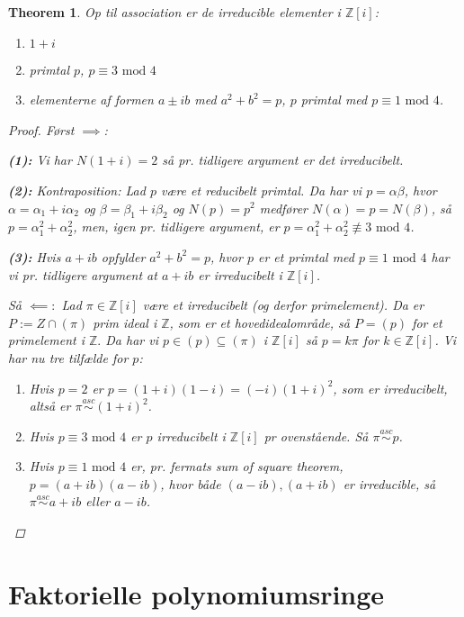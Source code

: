 \documentclass[10pt,twoside,openany,final]{memoir}
\theoremstyle{break}
\newtheorem{theorem}[section]{Theorem}
\theoremstyle{Break}
\newcommand{\Z}{\mathbb{Z}}
\begin{document}
\begin{theorem}
Op til association er de irreducible elementer i $\Z[i]$:
\begin{enumerate}
\item $1+i$
\item primtal $p$, $p \equiv 3 \textrm{ mod } 4$
\item elementerne af formen $a\pm ib$ med $a^2+b^2=p$, $p$ primtal med $p \equiv 1 \textrm{ mod } 4$.
\end{enumerate}
\begin{proof}
Først $\implies$:

\noindent \textbf{(1):} Vi har $N(1+i)=2$ så pr. tidligere argument er det irreducibelt. 

\noindent \textbf{(2):} Kontraposition: Lad $p$ være et reducibelt primtal. Da har vi $p=\alpha \beta$, hvor $\alpha=\alpha_1+i\alpha_2$ og $\beta=\beta_1+i\beta_2$ og $N(p)=p^2$ medfører $N(\alpha)=p=N(\beta)$, så $p=\alpha_1^2+\alpha_2^2$, men, igen pr. tidligere argument, er $p=\alpha_1^2+\alpha_2^2 \not \equiv  3 \textrm{ mod } 4$. 

\noindent \textbf{(3):} Hvis $a+ib$ opfylder $a^2+b^2=p$, hvor $p$ er et primtal med $p \equiv 1 \textrm{ mod } 4$ har vi pr. tidligere argument at $a+ib$ er irreducibelt i $\Z[i]$. 

\noindent Så $\impliedby:$ Lad $\pi \in \Z[i]$ være et irreducibelt (og derfor primelement). Da er $P:=Z\cap (\pi)$ prim ideal i $\Z$, som er et hovedidealområde, så $P=(p)$ for et primelement i $\Z.$ Da har vi $p \in (p) \subseteq (\pi)$ i $\Z[i]$ så $p=k \pi$ for $k \in \Z[i]$. Vi har nu tre tilfælde for $p$:
\begin{enumerate}
\item Hvis $p=2$ er $p=(1+i)(1-i)=(-i)(1+i)^2$, som er irreducibelt, altså er $\pi \stackrel{asc}{\sim} (1+i)^2$.
\item Hvis $p\equiv 3 \textrm{ mod } 4$ er $p$ irreducibelt i $\Z[i]$ pr ovenstående. Så $\pi \stackrel{asc}{\sim} p$.
\item Hvis $p \equiv 1 \textrm { mod } 4$ er, pr. fermats sum of square theorem, $p=(a+ib)(a-ib)$, hvor både $(a-ib),(a+ib)$ er irreducible, så $\pi \stackrel{asc}{\sim} a+ib$ eller $a-ib$.
\end{enumerate}
\end{proof}
\end{theorem}

\chapter{Faktorielle polynomiumsringe}
\end{document}
